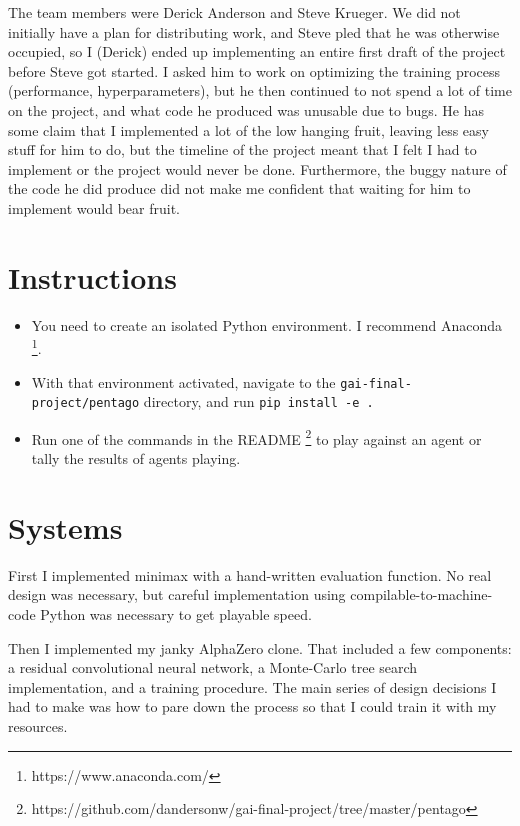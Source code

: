 \documentclass{article}
\begin{document}
The team members were Derick Anderson and Steve Krueger.
We did not initially have a plan for distributing work,
and Steve pled that he was otherwise occupied,
so I (Derick) ended up implementing an entire first draft of the project
before Steve got started.
I asked him to work on optimizing the training process
(performance, hyperparameters),
but he then continued to not spend a lot of time on the project,
and what code he produced was unusable due to bugs.
He has some claim that I implemented a lot of the low hanging fruit,
leaving less easy stuff for him to do,
but the timeline of the project meant that I felt I had to implement
or the project would never be done.
Furthermore,
the buggy nature of the code he did produce did not make me confident
that waiting for him to implement would bear fruit.

\section*{Instructions}

\begin{itemize}
\item You need to create an isolated Python environment.  I recommend Anaconda
  \footnote{https://www.anaconda.com/}.
\item With that environment activated, navigate to the
  \texttt{gai-final-project/pentago} directory, and run \texttt{pip install -e .}
\item Run one of the commands in the README
  \footnote{https://github.com/dandersonw/gai-final-project/tree/master/pentago}
  to play against an agent or tally the results of agents playing.
\end{itemize}

\section*{Systems}

First I implemented minimax with a hand-written evaluation function.
No real design was necessary,
but careful implementation using compilable-to-machine-code Python was necessary
to get playable speed.

Then I implemented my janky AlphaZero clone.
That included a few components:
a residual convolutional neural network,
a Monte-Carlo tree search implementation,
and a training procedure.
The main series of design decisions I had to make
was how to pare down the process so that I could train it with my resources.
\end{document}
